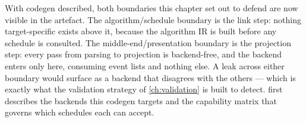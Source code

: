 With codegen described, both boundaries this chapter set out to defend are now
visible in the artefact. The algorithm/schedule boundary is the link step: nothing
target-specific exists above it, because the algorithm IR is built before any
schedule is consulted. The middle-end/presentation boundary is the projection
step: every pass from parsing to projection is backend-free, and the backend
enters only here, consuming event lists and nothing else. A leak across either
boundary would surface as a backend that disagrees with the others ---
which is exactly what the validation strategy of \cref{ch:validation} is built to
detect.  first describes the backends this codegen targets and
the capability matrix that governs which schedules each can accept.
